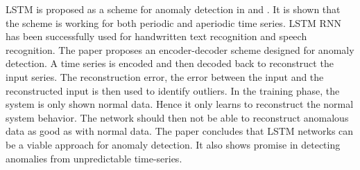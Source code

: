         
        LSTM is proposed as a scheme for anomaly detection in \cite{Malhotra2016} and \cite{Malhotra}. It is shown that the scheme is working for both periodic and aperiodic time series. LSTM RNN has been successfully used for handwritten text recognition and speech recognition. The paper proposes an encoder-decoder scheme designed for anomaly detection. A time series is encoded and then decoded back to reconstruct the input series. The reconstruction error, the error between the input and the reconstructed input is then used to identify outliers. In the training phase, the system is only shown normal data. Hence it only learns to reconstruct the normal system behavior. The network should then not be able to reconstruct anomalous data as good as with normal data. The paper concludes that LSTM networks can be a viable approach for anomaly detection. It also shows promise in detecting anomalies from unpredictable time-series.      
        